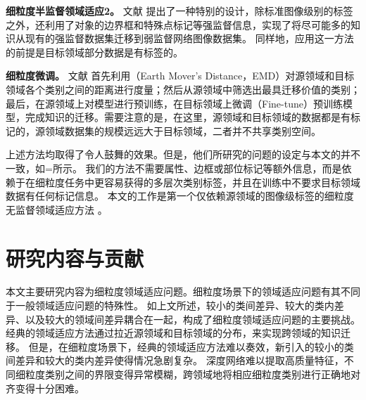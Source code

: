 \textbf{细粒度半监督领域适应2。}
文献 \cite{xu2018webly}提出了一种特别的设计，除标准图像级别的标签之外，还利用了对象的边界框和特殊点标记等强监督信息，实现了将尽可能多的知识从现有的强监督数据集迁移到弱监督网络图像数据集。
同样地，应用这一方法的前提是目标领域部分数据是有标签的。

\textbf{细粒度微调。}
文献 \cite{cui2018large} 首先利用（Earth Mover's Distance，EMD）对源领域和目标领域各个类别之间的距离进行度量；然后从源领域中筛选出最具迁移价值的类别；最后，在源领域上对模型进行预训练，在目标领域上微调（Fine-tune）预训练模型，完成知识的迁移。需要注意的是，在这里，源领域和目标领域的数据都是有标记的，源领域数据集的规模远远大于目标领域，二者并不共享类别空间。


上述方法均取得了令人鼓舞的效果。但是，他们所研究的{\kaishu 问题的设定与本文的并不一致}，如=所示。
我们的方法不需要属性、边框或部位标记等额外信息，而是依赖于在细粒度任务中更容易获得的多层次类别标签，并且在训练中不要求目标领域数据有任何标记信息。
{\kaishu 本文的工作是第一个仅依赖源领域的图像级标签的细粒度无监督领域适应方法 \cite{wangprogressive}。}








\section{研究内容与贡献}
本文主要研究内容为细粒度领域适应问题。细粒度场景下的领域适应问题有其不同于一般领域适应问题的特殊性。
如上文所述，较小的类间差异、较大的类内差异、以及较大的领域间差异耦合在一起，构成了细粒度领域适应问题的主要挑战。
经典的领域适应方法通过拉近源领域和目标领域的分布，来实现跨领域的知识迁移。
但是，在细粒度场景下，经典的领域适应方法难以奏效，新引入的较小的类间差异和较大的类内差异使得情况急剧复杂。
深度网络难以提取高质量特征，不同细粒度类别之间的界限变得异常模糊，跨领域地将相应细粒度类别进行正确地对齐变得十分困难。


